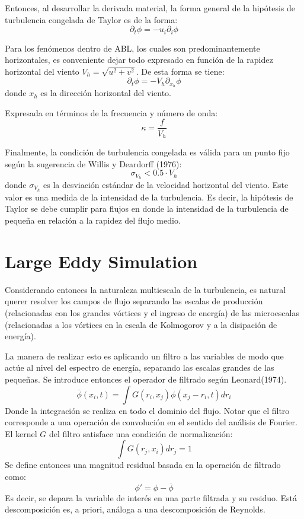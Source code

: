 Entonces, al desarrollar la derivada material, la forma general de la hipótesis de turbulencia congelada de Taylor es de la forma:
\begin{equation}
\partial_t \phi = -u_i\partial_i \phi
\end{equation}

Para los fenómenos dentro de ABL, los cuales son predominantemente horizontales, es conveniente dejar todo expresado en función de la rapidez horizontal del viento $V_h =\sqrt{u^2+v^2}$. De esta forma se tiene:
\begin{equation}
\partial_t \phi = -V_h\partial_{x_h}\phi
\end{equation}
donde $x_h$ es la dirección horizontal del viento.

Expresada en términos de la frecuencia y número de onda:
\begin{equation}
\kappa = \frac{f}{V_h}
\end{equation}

Finalmente, la condición de turbulencia congelada es válida para un punto fijo según la sugerencia de Willis y Deardorff (1976):
\begin{equation}
\sigma_{V_h}<0.5\cdot V_h
\end{equation}
donde $\sigma_{V_h}$ es la desviación estándar de la velocidad horizontal del viento. Este valor es una medida de la intensidad de la turbulencia. Es decir, la hipótesis de Taylor se debe cumplir para flujos en donde la intensidad de la turbulencia de pequeña en relación a la rapidez del flujo medio.
\section{Large Eddy Simulation}
Considerando entonces la naturaleza multiescala de la turbulencia, es natural querer resolver los campos de flujo separando las escalas de producción (relacionadas con los grandes vórtices y el ingreso de energía) de las microescalas (relacionadas a los vórtices en la escala de Kolmogorov y a la disipación de energía). 

La manera de realizar esto es aplicando un filtro a las variables de modo que actúe al nivel del espectro de energía, separando las escalas grandes de las pequeñas. Se introduce entonces el operador de filtrado según Leonard(1974).
\begin{equation}
\overline{\phi}(x_i,t) = \int G(r_i,x_j)\phi(x_j-r_i,t)dr_i
\end{equation}
Donde la integración se realiza en todo el dominio del flujo. Notar que el filtro corresponde a una operación de convolución en el sentido del análisis de Fourier. El kernel $G$ del filtro satisface una condición de normalización:
\begin{equation}
\int G(r_j,x_i)dr_j = 1
\end{equation}
Se define entonces una magnitud residual basada en la operación de filtrado como:
\begin{equation}
\phi' = \phi - \overline{\phi}
\end{equation}
Es decir, se depara la variable de interés en una parte filtrada y su residuo. Está descomposición es, a priori, análoga a una descomposición de Reynolds.

